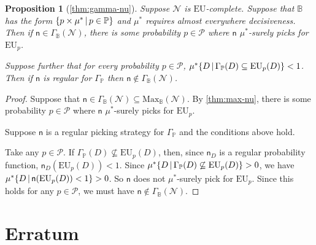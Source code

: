 \documentclass[a4paper,final]{article}
\newtheorem{proposition}[theorem]{Proposition}
\renewcommand\P{\mathbb{P}} %
\newcommand\Prob{\mathcal{P}} %
\newcommand\EU{\mathrm{EU}}
\newcommand\Maximality{\mathrm{Max}}
\newcommand\Maximin{\Gamma}
\renewcommand\S{\mathcal{S}}
\newcommand\s{\mathsf{s}}
\newcommand{\n}{\mathsf{n}}
\renewcommand{\nu}{\n}
\newcommand\Nu{\mathcal{N}}
\newcommand{\IB}{\mathbb{B}}
\newcommand{\IP}{\P}
\renewcommand{\color}[1]{}
\newenvironment{colored}[1]{\leavevmode\color{#1}}{}
\newcommand\SetDelimiter[1][]{
	\nonscript\,#1\vert \allowbreak \nonscript\,\mathopen{}}
\providecommand\given{\SetDelimiter}
\newenvironment{CCM rewritten}
{\begingroup\color{blue}} %
{\endgroup}              %
\begin{document}
\begin{colored}{blue}

\begin{proposition}[\cref{thm:gamma-nu}]
Suppose $\Nu$ is $\EU$-complete. Suppose that 
		$\IB$ has the form $\{p\times \mu^*\given p\in \IP\}$ and $\mu^*$ requires almost everywhere decisiveness. Then if $\n \in \Maximin_\IB(\Nu)$, there is some probability $p\in\Prob$ where $\n$ $\mu^*$-surely picks for $\EU_p$.
		
		Suppose further that for every probability $p\in\Prob$, $\mu^*\{D\given \Maximin_\IP(D)\subseteq\EU_p(D)\}<1$. 
		Then if $\n$ is regular for $\Maximin_\IP$ then $\n\notin \Maximin_\IB(\Nu)$.


	\end{proposition}


\begin{proof}
	Suppose that $\n \in \Maximin_\IB(\Nu)\subseteq\Maximality_\IB(\Nu)$. By  \cref{thm:max-nu}, there is some probability $p\in\Prob$ where $\n$ $\mu^*$-surely picks for $\EU_p$.
	
	
	Suppose $\nu$ is a regular picking strategy for $\Maximin_\IP$ and the conditions above hold. 
	
	Take any $p\in\Prob$.
	If $\Gamma_{\IP}(D)\not\subseteq\EU_p(D)$, then, since $\n_D$ is a regular probability function, $\nu_D(\EU_p(D))< 1$. 
	Since 
	$\mu^*\{D\given \Maximin_\IP(D)\not\subseteq\EU_p(D)\}>0$, we have $\mu^*\{D\given \nu(\EU_p(D))<1\}>0$.
	 So $\nu$ does not $\mu^*$-surely pick for $\EU_p$. Since this holds for any $p \in \Prob$, we must have $\n \not\in \Maximin_\IB(\Nu)$.
	 
\end{proof}
\end{colored}



\appendix
\part{Erratum}
\end{document}
